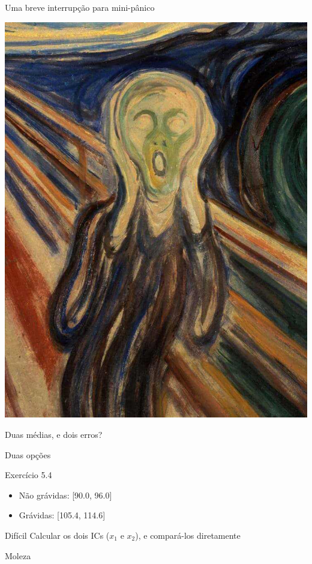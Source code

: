 \documentclass{beamer}
\begin{document}
\begin{frame}{Uma breve interrupção para mini-pânico}
  \begin{center}
    \includegraphics[height=.7\textheight]{Cap7/ogrito}
  \end{center}
  \begin{block}{}
    \begin{center}
      Duas médias, e dois erros?
    \end{center}
  \end{block}
\end{frame}

\begin{frame}{Duas opções}
  \begin{exampleblock}{Exercício 5.4}
    \begin{itemize}
    \item Não grávidas: [90.0, 96.0]
    \item Grávidas: [105.4, 114.6]
    \end{itemize}
  \end{exampleblock}
  \begin{block}{Difícil}
    Calcular os dois ICs ($x_1$ e $x_2$), e compará-los diretamente
  \end{block}
  \begin{block}{Moleza}
  \end{block}
\end{frame}
\end{document}

